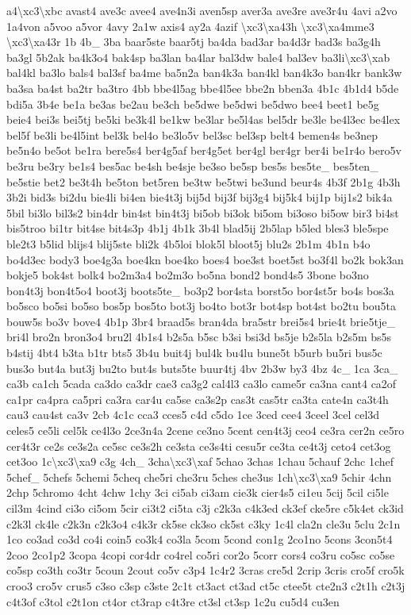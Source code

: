 \begin{DoxyCompactItemize}
a4\textbackslash{}xc3\textbackslash{}xbc avast4 ave3c avee4 ave4n3i aven5sp aver3a ave3re ave3r4u 4avi a2vo 1a4von a5voo a5vor 4avy 2a1w axis4 ay2a 4azif \textbackslash{}xc3\textbackslash{}xa43h \textbackslash{}xc3\textbackslash{}xa4mme3 \textbackslash{}xc3\textbackslash{}xa43r 1b 4b\-\_\- 3ba baar5ste baar5tj ba4da bad3ar ba4d3r bad3s ba3g4h ba3gl 5b2ak ba4k3o4 bak4sp ba3lan ba4lar bal3dw bale4 bal3ev ba3li\textbackslash{}xc3\textbackslash{}xab bal4kl ba3lo bals4 bal3sf ba4me ba5n2a ban4k3a ban4kl ban4k3o ban4kr bank3w ba3sa ba4st ba2tr ba3tro 4bb bbe4l5ag bbe4l5ee bbe2n bben3a 4b1c 4b1d4 b5de bdi5a 3b4e be1a be3as be2au be3ch be5dwe be5dwi be5dwo bee4 beet1 be5g beie4 bei3s bei5tj be5ki be3k4l be1kw be3lar be5l4as bel5dr be3le be4l3ec be4lex bel5f be3li be4l5int bel3k bel4o be3lo5v bel3sc bel3sp belt4 bemen4s be3nep be5n4o be5ot be1ra bere5s4 ber4g5af ber4g5et ber4gl ber4gr ber4i be1r4o bero5v be3ru be3ry be1s4 bes5ac be4sh be4sje be3so be5sp bes5s bes5te\-\_\- bes5ten\-\_\- be5stie bet2 be3t4h be5ton bet5ren be3tw be5twi be3und beur4s 4b3f 2b1g 4b3h 3b2i bid3s bi2du bie4li bi4en bie4t3j bij5d bij3f bij3g4 bij5k4 bij1p bij1s2 bik4a 5bil bi3lo bil3s2 bin4dr bin4st bin4t3j bi5ob bi3ok bi5om bi3oso bi5ow bir3 bi4st bis5troo bi1tr bit4se bit4s3p 4b1j 4b1k 3b4l blad5ij 2b5lap b5led bles3 ble5spe ble2t3 b5lid blijs4 blij5ste bli2k 4b5loi blok5l bloot5j blu2s 2b1m 4b1n b4o bo4d3ec body3 boe4g3a boe4kn boe4ko boes4 boe3st boet5st bo3f4l bo2k bok3an bokje5 bok4st bolk4 bo2m3a4 bo2m3o bo5na bond2 bond4s5 3bone bo3no bon4t3j bon4t5o4 boot3j boots5te\-\_\- bo3p2 bor4sta borst5o bor4st5r bo4s bos3a bo5sco bo5si bo5so bos5p bos5to bot3j bo4to bot3r bot4sp bot4st bo2tu bou5ta bouw5s bo3v bove4 4b1p 3br4 braad5s bran4da bra5str brei5s4 brie4t brie5tje\-\_\- bri4l bro2n bron3o4 bru2l 4b1s4 b2s5a b5sc b3si bsi3d bs5je b2s5la b2s5m bs5s b4stij 4bt4 b3ta b1tr bts5 3b4u buit4j bul4k bu4lu bune5t b5urb bu5ri bus5c bus3o but4a but3j bu2to but4s buts5te buur4tj 4bv 2b3w by3 4bz 4c\-\_\- 1ca 3ca\-\_\- ca3b ca1ch 5cada ca3do ca3dr cae3 ca3g2 cal4l3 ca3lo came5r ca3na cant4 ca2of ca1pr ca4pra ca5pri ca3ra car4u ca5se ca3s2p cas3t cas5tr ca3ta cate4n ca3t4h cau3 cau4st ca3v 2cb 4c1c cca3 cces5 c4d c5do 1ce 3ced cee4 3ceel 3cel cel3d celes5 ce5li cel5k ce4l3o 2ce3n4a 2cene ce3no 5cent cen4t3j ceo4 ce3ra cer2n ce5ro cer4t3r ce2s ce3s2a ce5sc ce3s2h ce3sta ce3s4ti cesu5r ce3ta ce4t3j ceto4 cet3og cet3oo 1c\textbackslash{}xc3\textbackslash{}xa9 c3g 4ch\-\_\- 3cha\textbackslash{}xc3\textbackslash{}xaf 5chao 3chas 1chau 5chauf 2chc 1chef 5chef\-\_\- 5chefs 5chemi 5cheq che5ri che3ru 5ches che3us 1ch\textbackslash{}xc3\textbackslash{}xa9 5chir 4chn 2chp 5chromo 4cht 4chw 1chy 3ci ci5ab ci3am cie3k cier4s5 ci1eu 5cij 5cil ci5le cil3m 4cind ci3o ci5om 5cir ci3t2 ci5ta c3j c2k3a c4k3ed ck3ef cke5re c5k4et ck3id c2k3l ck4le c2k3n c2k3o4 c4k3r ck5se ck3so ck5st c3ky 1c4l cla2n cle3u 5clu 2c1n 1co co3ad co3d co4i coin5 co3k4 co3la 5com 5cond con1g 2co1no 5cons 3con5t4 2coo 2co1p2 3copa 4copi cor4dr co4rel co5ri cor2o 5corr cors4 co3ru co5sc co5se co5sp co3th co3tr 5coun 2cout co5v c3p4 1c4r2 3cras cre5d 2crip 3cris cro5f cro5k croo3 cro5v crus5 c3so c3sp c3ste 2c1t ct3act ct3ad ct5c ctee5t cte2n3 c2t1h c2t3j c4t3of c3tol c2t1on ct4or ct3rap c4t3re ct3sl ct3sp 1c2u cu5d4 cu3en 
\end{DoxyCompactItemize}
